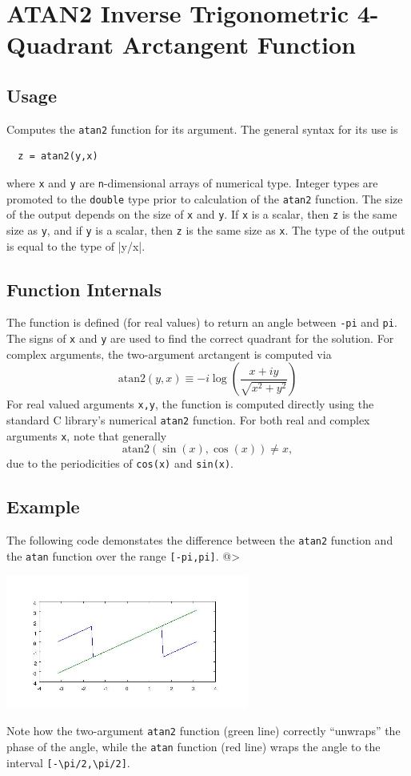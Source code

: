 \section{ATAN2 Inverse Trigonometric 4-Quadrant Arctangent Function}

\subsection{Usage}

Computes the \verb|atan2| function for its argument.  The general
syntax for its use is
\begin{verbatim}
  z = atan2(y,x)
\end{verbatim}
where \verb|x| and \verb|y| are \verb|n|-dimensional arrays of numerical type.
Integer types are promoted to the \verb|double| type prior to
calculation of the \verb|atan2| function. The size of the output depends
on the size of \verb|x| and \verb|y|.  If \verb|x| is a scalar, then \verb|z|
is the same size as \verb|y|, and if \verb|y| is a scalar, then \verb|z|
is the same size as \verb|x|.  The type of the output is equal to the type of
|y/x|.  
\subsection{Function Internals}

The function is defined (for real values) to return an 
angle between \verb|-pi| and \verb|pi|.  The signs of \verb|x| and \verb|y|
are used to find the correct quadrant for the solution.  For complex
arguments, the two-argument arctangent is computed via
\[
  \mathrm{atan2}(y,x) \equiv -i \log\left(\frac{x+i y}{\sqrt{x^2+y^2}} \right)
\]
For real valued arguments \verb|x,y|, the function is computed directly using 
the standard C library's numerical \verb|atan2| function. For both 
real and complex arguments \verb|x|, note that generally
\[
  \mathrm{atan2}(\sin(x),\cos(x)) \neq x,
\]
due to the periodicities of  \verb|cos(x)| and \verb|sin(x)|.
\subsection{Example}

The following code demonstates the difference between the \verb|atan2| 
function and the \verb|atan| function over the range \verb|[-pi,pi]|.
@>


\centerline{\includegraphics[width=8cm]{atan2plot}}

Note how the two-argument \verb|atan2| function (green line) 
correctly ``unwraps'' the phase of the angle, while the \verb|atan| 
function (red line) wraps the angle to the interval \verb|[-\pi/2,\pi/2]|.
